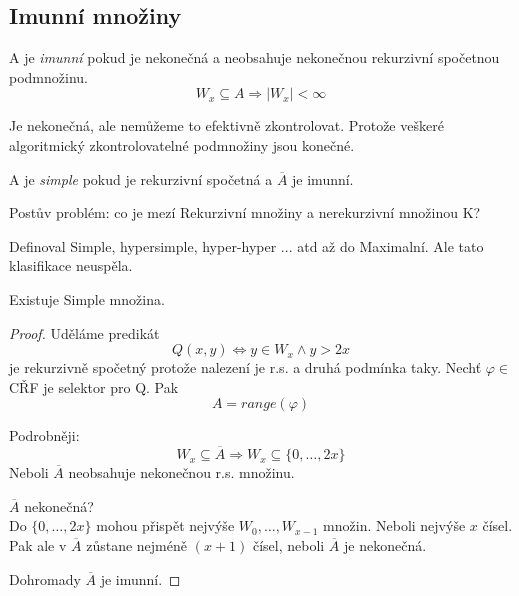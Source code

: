 \subsection{Imunní množiny}

\begin{definition}
	A je \emph{imunní} pokud je nekonečná a neobsahuje nekonečnou rekurzivní spočetnou podmnožinu.
	\[ W_x \subseteq A \Rightarrow |W_x| < \infty \]

	Je nekonečná, ale nemůžeme to efektivně zkontrolovat.
	Protože veškeré algoritmický zkontrolovatelné podmnožiny jsou konečné.
\end{definition}

\begin{definition}[Simple]
	A je \emph{simple} pokud je rekurzivní spočetná a $\overline{A}$ je imunní.
\end{definition}

\begin{note}
	Postův problém: co je mezí Rekurzivní množiny a nerekurzivní množinou K?

	Definoval Simple, hypersimple, hyper-hyper ... atd až do Maximalní.
	Ale tato klasifikace neuspěla.
\end{note}

\begin{theorem}
	Existuje Simple množina.
\end{theorem}
\begin{proof}
	Uděláme predikát
	\[ Q(x, y) \iff y \in W_x \land y > 2x \]
	je rekurzivně spočetný protože nalezení je r.s. a druhá podmínka taky.
	Nechť $\varphi \in $ CŘF je selektor pro Q.
	Pak
	\[ A = range(\varphi) \]

	Podrobněji:
	\[ W_x \subseteq \overline{A} \Rightarrow W_x \subseteq \{ 0, \ldots, 2x \} \]
	Neboli $\overline{A}$ neobsahuje nekonečnou r.s. množinu.

	$\overline{A}$ nekonečná? \\
	Do $\{ 0, \ldots, 2x \}$ mohou přispět nejvýše $W_0, \ldots, W_{x - 1}$ množin.
	Neboli nejvýše $x$ čísel.
	Pak ale v $\overline{A}$ zůstane nejméně $(x + 1)$ čísel, neboli $\overline{A}$ je nekonečná.

	Dohromady $\overline{A}$ je imunní.

\end{proof}
